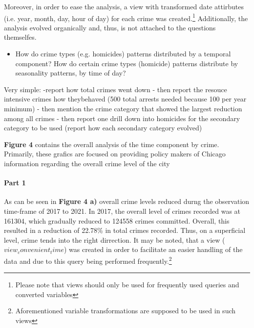 \documentclass[a4paper]{article}
\begin{document}
Moreover, in order to ease the analysis, a view with transformed date attirbutes (i.e. year, month, day, hour of day) for each crime was created.\footnote{Please note that views should only be used for frequently used queries and converted variables}
Additionally, the analysis evolved organically and, thus, is not attached to the questions themselfes. 

\begin{itemize}
  \item How do crime types (e.g. homicides) patterns distributed by a temporal component? How do certain crime types (homicide) patterns distribute by seasonality patterns, by time of day?
\end{itemize}

Very simple:
-report how total crimes went down
- then report the resouce intensive crimes how theybehaved (500 total arrests needed because 100 per year minimum)
- then mention the crime category that showed the largest reduction among all crimes
- then report one drill down into homicides for the secondary category to be used (report how each secondary category evolved)

\textbf{Figure 4} contains the overall analysis of the time component by crime. Primarily, these grafics are focused on providing policy makers of Chicago information regarding the overall crime level of the city

\paragraph{Part 1} As can be seen in \textbf{Figure 4 a)} overall crime levels reduced durng the observation time-frame of 2017 to 2021. In 2017, the overall level of crimes recorded was at 161304, which gradually reduced to 124558 crimes committed. Overall, this resulted in a reduction of 22.78\% in total crimes recorded. Thus, on a superficial level, crime tends into the right dirrection. It may be noted, that a view ($view_convenient_time$) was created in order to facilitate an easier handling of the data and due to this query being performed frequently.\footnote{Aforementioned variable transformations are supposed to be used in such views}
\end{document}
